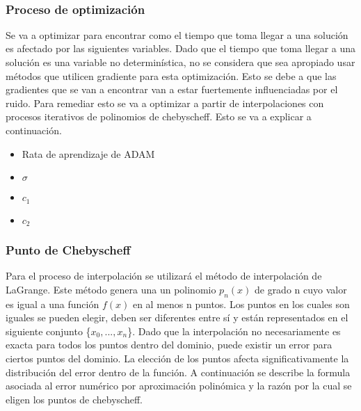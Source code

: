 \documentclass[11pt]{article}
\providecommand{\tightlist}{%
      \setlength{\itemsep}{0pt}\setlength{\parskip}{0pt}}
\begin{document}
    \begin{center}
    \end{center}
    { \hspace*{\fill} \\}
    
    \hypertarget{proceso-de-optimizaciuxf3n}{%
\subsubsection{Proceso de
optimización}\label{proceso-de-optimizaciuxf3n}}

Se va a optimizar para encontrar como el tiempo que toma llegar a una
solución es afectado por las siguientes variables. Dado que el tiempo
que toma llegar a una solución es una variable no determinística, no se
considera que sea apropiado usar métodos que utilicen gradiente para
esta optimización. Esto se debe a que las gradientes que se van a
encontrar van a estar fuertemente influenciadas por el ruido. Para
remediar esto se va a optimizar a partir de interpolaciones con procesos
iterativos de polinomios de chebyscheff. Esto se va a explicar a
continuación.

\begin{itemize}
\tightlist
\item
  Rata de aprendizaje de ADAM
\item
  \(\sigma\)
\item
  \(c_1\)
\item
  \(c_2\)
\end{itemize}

\hypertarget{punto-de-chebyscheff}{%
\subsubsection{Punto de Chebyscheff}\label{punto-de-chebyscheff}}

Para el proceso de interpolación se utilizará el método de interpolación
de LaGrange. Este método genera una un polinomio \(p_n(x)\) de grado n
cuyo valor es igual a una función \(f(x)\) en al menos n puntos. Los
puntos en los cuales son iguales se pueden elegir, deben ser diferentes
entre sí y están representados en el siguiente conjunto
\{\(x_0 , ... , x_n\)\}. Dado que la interpolación no necesariamente es
exacta para todos los puntos dentro del dominio, puede existir un error
para ciertos puntos del dominio. La elección de los puntos afecta
significativamente la distribución del error dentro de la función. A
continuación se describe la formula asociada al error numérico por
aproximación polinómica y la razón por la cual se eligen los puntos de
chebyscheff.
\end{document}
